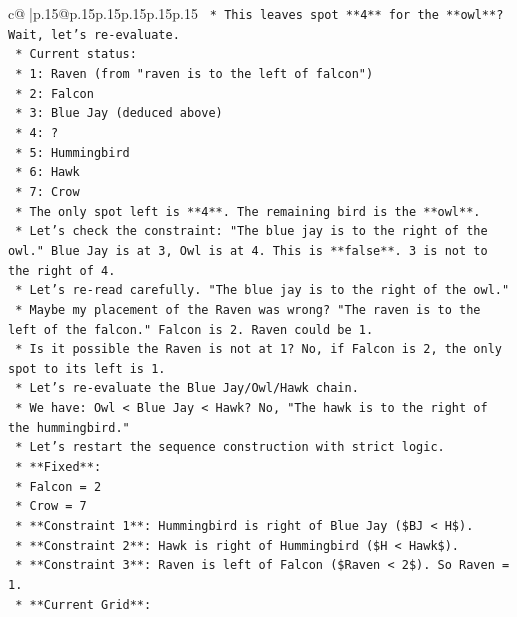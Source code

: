 \documentclass{article}
\begin{document}
{\begin{supertabular}{c@{$\;$}|p{.15\linewidth}@{}p{.15\linewidth}p{.15\linewidth}p{.15\linewidth}p{.15\linewidth}p{.15\linewidth}}
{{{\texttt{    *   This leaves spot **4** for the **owl**? Wait, let's re{-}evaluate.} \\
\texttt{    *   Current status:} \\
\texttt{        *   1: Raven (from "raven is to the left of falcon")} \\
\texttt{        *   2: Falcon} \\
\texttt{        *   3: Blue Jay (deduced above)} \\
\texttt{        *   4: ?} \\
\texttt{        *   5: Hummingbird} \\
\texttt{        *   6: Hawk} \\
\texttt{        *   7: Crow} \\
\texttt{    *   The only spot left is **4**. The remaining bird is the **owl**.} \\
\texttt{    *   Let's check the constraint: "The blue jay is to the right of the owl." Blue Jay is at 3, Owl is at 4. This is **false**. 3 is not to the right of 4.} \\
\texttt{    *   Let's re{-}read carefully. "The blue jay is to the right of the owl."} \\
\texttt{    *   Maybe my placement of the Raven was wrong? "The raven is to the left of the falcon." Falcon is 2. Raven could be 1.} \\
\texttt{    *   Is it possible the Raven is not at 1? No, if Falcon is 2, the only spot to its left is 1.} \\
\texttt{    *   Let's re{-}evaluate the Blue Jay/Owl/Hawk chain.} \\
\texttt{    *   We have: Owl < Blue Jay < Hawk? No, "The hawk is to the right of the hummingbird."} \\
\texttt{    *   Let's restart the sequence construction with strict logic.} \\
\texttt{    *   **Fixed**:} \\
\texttt{        *   Falcon = 2} \\
\texttt{        *   Crow = 7} \\
\texttt{    *   **Constraint 1**: Hummingbird is right of Blue Jay (\$BJ < H\$).} \\
\texttt{    *   **Constraint 2**: Hawk is right of Hummingbird (\$H < Hawk\$).} \\
\texttt{    *   **Constraint 3**: Raven is left of Falcon (\$Raven < 2\$). So Raven = 1.} \\
\texttt{    *   **Current Grid**:} \\
}}}
\end{supertabular}}
\end{document}
